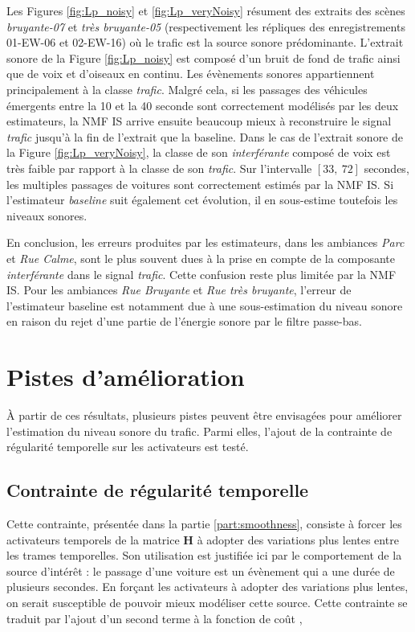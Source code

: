 Les Figures \ref{fig:Lp_noisy} et \ref{fig:Lp_veryNoisy} résument des extraits des scènes \textit{bruyante-07} et \textit{très bruyante-05} (respectivement les répliques des enregistrements 01-EW-06 et 02-EW-16) où le trafic est la source sonore prédominante. L'extrait sonore de la Figure \ref{fig:Lp_noisy} est composé d'un bruit de fond de trafic ainsi que de voix et d'oiseaux en continu. Les évènements sonores appartiennent principalement à la classe \textit{trafic}. Malgré cela, si les passages des véhicules émergents entre la 10\ieme{} et la 40\ieme{} seconde sont correctement modélisés par les deux estimateurs, la NMF IS arrive ensuite beaucoup mieux à reconstruire le signal \textit{trafic} jusqu'à la fin de l'extrait que la baseline. Dans le cas de l'extrait sonore de la Figure \ref{fig:Lp_veryNoisy}, la classe de son \textit{interférante} composé de voix est très faible par rapport à la classe de son \textit{trafic}. Sur l'intervalle $\left[ 33,~72 \right]$ secondes, les multiples passages de voitures sont correctement estimés par la NMF IS. Si l'estimateur \textit{baseline} suit également cet évolution, il en sous-estime toutefois les niveaux sonores.

En conclusion, les erreurs produites par les estimateurs, dans les ambiances \textit{Parc} et \textit{Rue Calme}, sont le plus souvent dues à la prise en compte de la composante \textit{interférante} dans le signal \textit{trafic}. Cette confusion reste plus limitée par la NMF IS. Pour les ambiances \textit{Rue Bruyante} et \textit{Rue très bruyante}, l'erreur de l'estimateur baseline est notamment due à une sous-estimation du niveau sonore en raison du rejet d'une partie de l'énergie sonore par le filtre passe-bas. 

\section{Pistes d'amélioration}

\`A partir de ces résultats, plusieurs pistes peuvent être envisagées pour améliorer l'estimation du niveau sonore du trafic. Parmi elles, l'ajout de la contrainte de régularité temporelle sur les activateurs est testé.

\subsection{Contrainte de régularité temporelle}

Cette contrainte, présentée dans la partie \ref{part:smoothness}, consiste à forcer les activateurs temporels de la matrice $\mathbf{H}$ à adopter des variations plus lentes entre les trames temporelles. Son utilisation est justifiée ici par le comportement de la source d'intérêt : le passage d'une voiture est un évènement qui a une durée de plusieurs secondes. En forçant les activateurs à adopter des variations plus lentes, on serait susceptible de pouvoir mieux modéliser cette source. Cette contrainte se traduit par l'ajout d'un second terme à la fonction de coût \cite{virtanen_monaural_2007}, 


